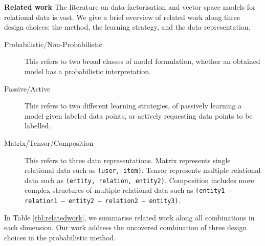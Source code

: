 
\textbf{Related work}
The literature on data factorisation and vector space models for 
relational data is vast. 
We give a brief overview of related work along three design choices:
the method, the learning strategy, and the data representation. 
\begin{description}
\item[Probabilistic/Non-Probabilistic] This refers to two broad classes of model 
formulation, whether an obtained model has a probabilistic interpretation. 
\item[Passive/Active] This refers to two different learning strategies, 
of passively learning a model given labeled data points, or actively 
requesting data points to be labelled.
\item[Matrix/Tensor/Composition] This refers to three data representations. Matrix represents single relational data such as \texttt{(user, item)}.
Tensor represents multiple relational data such as \texttt{(entity, relation, entity2)}.
Composition includes more complex structures of multiple relational data such as \texttt{(entity1 -- relation1 -- entity2 -- relation2 -- entity3)}.
\end{description}
In Table \ref{tbl:relatedwork}, we summarise related work along all combinations in each dimension.
Our work address the uncovered combination of three design choices in the probabilistic method.

